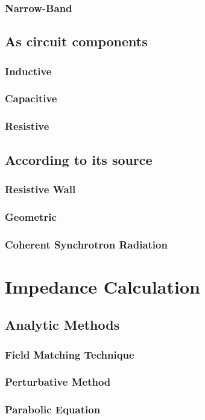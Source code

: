 \documentclass[
	12pt,				%
	openright,			%
	oneside,			%
	a4paper,		%
	chapter=TITLE,		%
	section=TITLE,		%
    brazil,				%
	english,			%
	sumario=tradicional,
	]{abntex2}
\begin{document}
      \subsubsection{Narrow-Band}
    \subsection{As circuit components}
      \subsubsection{Inductive}
      \subsubsection{Capacitive}
      \subsubsection{Resistive}
    \subsection{According to its source}
      \subsubsection{Resistive Wall}
      \subsubsection{Geometric}
      \subsubsection{Coherent Synchrotron Radiation}
  \section{Impedance Calculation}
    \subsection{Analytic Methods}
      \subsubsection{Field Matching Technique}
      \subsubsection{Perturbative Method}
      \subsubsection{Parabolic Equation}
\end{document}
